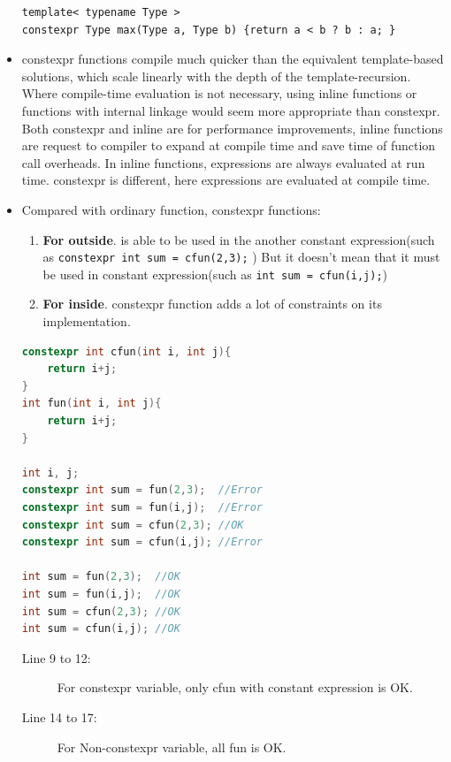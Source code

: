 \documentclass[a4paper,11pt,twoside]{book}
\begin{document}
\begin{itemize}
\begin{lstlisting}[numbers=none]
template< typename Type > 
constexpr Type max(Type a, Type b) {return a < b ? b : a; }
\end{lstlisting}		
		
	\item constexpr functions compile much quicker than the equivalent template-based solutions, which scale linearly with the depth of the template-recursion. Where compile-time evaluation is not necessary, using inline functions or functions with internal linkage would seem more appropriate than constexpr. Both constexpr and inline are for performance improvements, inline functions are request to compiler to expand at compile time and save time of function call overheads. In inline functions, expressions are always evaluated at run time. constexpr is different, here expressions are evaluated at compile time.

	
	\item Compared with ordinary function, constexpr functions:
	\begin{enumerate}
		\item \textbf{For outside}. is able to be used in the another constant expression(such as \texttt{constexpr int sum = cfun(2,3);} ) But it doesn't mean that it must be used in constant expression(such as \texttt{int sum = cfun(i,j);})
		
		
		\item \textbf{For inside}. constexpr function adds a lot of constraints on its implementation.
	\end{enumerate}
	
\begin{lstlisting}[frame=single, language=c++]
constexpr int cfun(int i, int j){
	return i+j;
}
int fun(int i, int j){
	return i+j;
}

int i, j;
constexpr int sum = fun(2,3);  //Error
constexpr int sum = fun(i,j);  //Error
constexpr int sum = cfun(2,3); //OK
constexpr int sum = cfun(i,j); //Error

int sum = fun(2,3);  //OK
int sum = fun(i,j);  //OK
int sum = cfun(2,3); //OK
int sum = cfun(i,j); //OK
\end{lstlisting}
	
	\begin{description}
		\item[Line 9 to 12:] For constexpr variable, only cfun with constant expression is OK.
		\item[Line 14 to 17:] For Non-constexpr variable, all fun is OK.
	\end{description}
	

\end{itemize}
\end{document}
